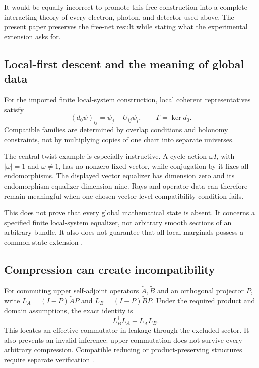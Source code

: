 \documentclass[11pt,a4paper]{article}
\begin{document}
It would be equally incorrect to promote this free construction into a complete interacting theory of every electron, photon, and detector used above. The present paper preserves the free-net result while stating what the experimental extension asks for.

\subsection{Local-first descent and the meaning of global data}
For the imported finite local-system construction, local coherent representatives satisfy
\begin{equation}
(d_0\psi)_{ij}=\psi_j-U_{ij}\psi_i,\qquad \Gamma=\ker d_0.
\end{equation}
Compatible families are determined by overlap conditions and holonomy constraints, not by multiplying copies of one chart into separate universes.

The central-twist example is especially instructive. A cycle action \(\omega I\), with \(|\omega|=1\) and \(\omega\ne1\), has no nonzero fixed vector, while conjugation by it fixes all endomorphisms. The displayed vector equalizer has dimension zero and its endomorphism equalizer dimension nine. Rays and operator data can therefore remain meaningful when one chosen vector-level compatibility condition fails.

This does not prove that every global mathematical state is absent. It concerns a specified finite local-system equalizer, not arbitrary smooth sections of an arbitrary bundle. It also does not guarantee that all local marginals possess a common state extension \cite{NeroResults,NeroRepair}.

\subsection{Compression can create incompatibility}
For commuting upper self-adjoint operators \(\widetilde A,\widetilde B\) and an orthogonal projector \(P\), write
\(L_A=(I-P)\widetilde A P\) and \(L_B=(I-P)\widetilde B P\).
Under the required product and domain assumptions, the exact identity is
\begin{equation}
[P\widetilde A P,P\widetilde B P]=L_B^\dagger L_A-L_A^\dagger L_B.
\end{equation}
This locates an effective commutator in leakage through the excluded sector. It also prevents an invalid inference: upper commutation does not survive every arbitrary compression. Compatible reducing or product-preserving structures require separate verification \cite{NeroConstraint,NeroResults}.
\end{document}
